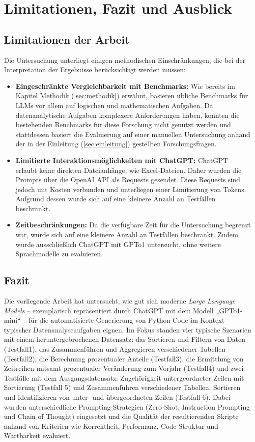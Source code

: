\documentclass[11pt,a4paper]{article}
\begin{document}
\section{Limitationen, Fazit und Ausblick}
\subsection{Limitationen der Arbeit}
\label{sec:limitationen}
Die Untersuchung unterliegt einigen methodischen Einschränkungen, die bei der Interpretation der Ergebnisse berücksichtigt werden müssen:

\begin{itemize}
    \item \textbf{Eingeschränkte Vergleichbarkeit mit Benchmarks:} Wie bereits im Kapitel Methodik (\ref{sec:methodik}) erwähnt, basieren übliche Benchmarks für LLMs vor allem auf logischen und mathematischen Aufgaben. Da datenanalytische Aufgaben komplexere Anforderungen haben, konnten die bestehenden Benchmarks für diese Forschung nicht genutzt werden und stattdessen basiert die Evaluierung auf einer manuellen Untersuchung anhand der in der Einleitung (\ref{sec:einleitung}) gestellten Forschungsfragen.
    \item \textbf{Limitierte Interaktionsmöglichkeiten mit ChatGPT:} ChatGPT erlaubt keine direkten Dateianhänge, wie Excel-Dateien. Daher wurden die Prompts über die OpenAI API als Requests gesendet. Diese Requests sind jedoch mit Kosten verbunden und unterliegen einer Limitierung von Tokens. Aufgrund dessen wurde sich auf eine kleinere Anzahl an Testfällen beschränkt.
    \item \textbf{Zeitbeschränkungen:} Da die verfügbare Zeit für die Untersuchung begrenzt war, wurde sich auf eine kleinere Anzahl an Testfällen beschränkt. Zudem wurde ausschließlich ChatGPT mit GPTo1 untersucht, ohne weitere Sprachmodelle zu evaluieren.
\end{itemize}

\subsection{Fazit}
\label{sec:fazit}
Die vorliegende Arbeit hat untersucht, wie gut sich moderne \emph{Large Language Models} – exemplarisch repräsentiert durch ChatGPT mit dem Modell „GPTo1-mini“ – für die automatisierte Generierung von Python-Code im Kontext typischer Datenanalyseaufgaben eignen. Im Fokus standen vier typische Szenarien mit einem heruntergebrochenen Datensatz: das Sortieren und Filtern von Daten (Testfall1), das Zusammenführen und Aggregieren verschiedener Tabellen (Testfall2), die Berechnung prozentualer Anteile (Testfall3), die Ermittlung von Zeitreihen mitsamt prozentualer Veränderung zum Vorjahr (Testfall4) und zwei Testfälle mit dem Ausgangsdatensatz: Zugehörigkeit untergeordneter Zeilen mit Sortierung (Testfall 5) und Zusammenführen verschiedener Tabellen, Sortieren und Identifizieren von unter- und übergeordneten Zeilen (Testfall 6). Dabei wurden unterschiedliche Prompting-Strategien (Zero-Shot, Instruction Prompting und Chain of Thought) eingesetzt und die Qualität der resultierenden Skripte anhand von Kriterien wie Korrektheit, Performanz, Code-Struktur und Wartbarkeit evaluiert.
\end{document}
